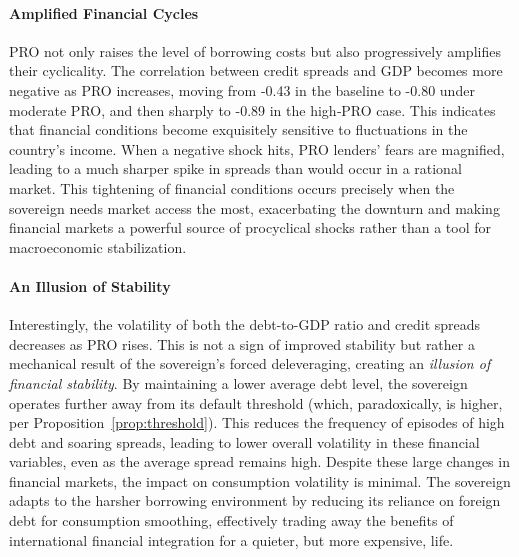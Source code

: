 \documentclass[12pt]{article}
\theoremstyle{plain}
\begin{document}
\paragraph{Amplified Financial Cycles}
PRO not only raises the level of borrowing costs but also progressively
amplifies their cyclicality. The correlation between credit spreads and GDP
becomes more negative as PRO increases, moving from -0.43 in the baseline to
-0.80 under moderate PRO, and then sharply to -0.89 in the high‑PRO case. This
indicates that financial conditions become exquisitely sensitive to
fluctuations in the country's income. When a negative shock hits, PRO lenders'
fears are magnified, leading to a much sharper spike in spreads than would
occur in a rational market. This tightening of financial conditions occurs
precisely when the sovereign needs market access the most, exacerbating the
downturn and making financial markets a powerful source of procyclical shocks
rather than a tool for macroeconomic stabilization.

\paragraph{An Illusion of Stability}
Interestingly, the volatility of both the debt-to-GDP ratio and credit spreads
decreases as PRO rises. This is not a sign of improved stability but rather a
mechanical result of the sovereign's forced deleveraging, creating an
\textit{illusion of financial stability}. By maintaining a lower average debt
level, the sovereign operates further away from its default threshold (which,
paradoxically, is higher, per Proposition~\ref{prop:threshold}). This reduces
the frequency of episodes of high debt and soaring spreads, leading to lower
overall volatility in these financial variables, even as the average spread
remains high. Despite these large changes in financial markets, the impact on
consumption volatility is minimal. The sovereign adapts to the harsher
borrowing environment by reducing its reliance on foreign debt for consumption
smoothing, effectively trading away the benefits of international financial
integration for a quieter, but more expensive, life.
\end{document}
